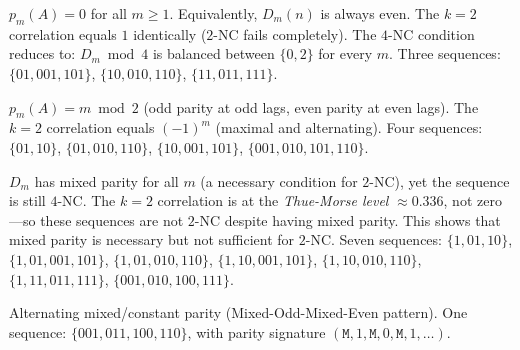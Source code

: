 \documentclass[11pt]{article}
\theoremstyle{definition}
\theoremstyle{remark}
\begin{document}
\begin{description}[leftmargin=2cm, labelwidth=2cm]

\item[\textbf{ALL-EVEN.}]
$p_m(A) = 0$ for all $m \geq 1$.  Equivalently, $D_m(n)$ is always
even.  The $k=2$ correlation equals $1$ identically ($2$-NC fails
completely).  The $4$-NC condition reduces to: $D_m \bmod 4$ is
balanced between $\{0, 2\}$ for every $m$.
Three sequences:
$\{01,001,101\}$, $\{10,010,110\}$, $\{11,011,111\}$.

\item[\textbf{ALTERNATING.}]
$p_m(A) = m \bmod 2$ (odd parity at odd lags, even parity at even
lags).  The $k=2$ correlation equals $(-1)^m$ (maximal and alternating).
Four sequences: $\{01,10\}$, $\{01,010,110\}$,
$\{10,001,101\}$, $\{001,010,101,110\}$.

\item[\textbf{MIXED$+$TM.}]
$D_m$ has mixed parity for all $m$ (a necessary condition for $2$-NC),
yet the sequence is still $4$-NC.  The $k=2$ correlation is at the
\emph{Thue-Morse level} $\approx 0.336$, not zero---so these sequences
are not $2$-NC despite having mixed parity.  This shows that mixed
parity is necessary but not sufficient for $2$-NC.  Seven sequences:
$\{1,01,10\}$, $\{1,01,001,101\}$, $\{1,01,010,110\}$,
$\{1,10,001,101\}$, $\{1,10,010,110\}$, $\{1,11,011,111\}$,
$\{001,010,100,111\}$.

\item[\textbf{MOME.}]
Alternating mixed/constant parity (Mixed-Odd-Mixed-Even pattern).
One sequence: $\{001,011,100,110\}$, with parity signature
$(\mathtt{M},1,\mathtt{M},0,\mathtt{M},1,\ldots)$.

\end{description}
\end{document}

